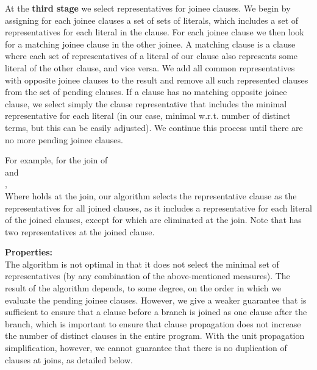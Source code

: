 At the \textbf{third stage} we select representatives for joinee clauses. 
We begin by assigning for each joinee clauses a set of sets of literals, which includes a set of representatives for each literal in the clause. For each joinee clause we then look for a matching joinee clause in the other joinee. 
A matching clause is a clause where each set of representatives of a literal of our clause also represents some literal of the other clause, and vice versa. We add all common representatives with opposite joinee clauses to the result and remove all such represented clauses from the set of pending clauses. If a clause has no matching opposite joinee clause, we select simply the clause representative that includes the minimal representative for each literal (in our case, minimal w.r.t. number of distinct terms, but this can be easily adjusted). We continue this process until there are no more pending joinee clauses.

For example, for the join of \\
 and \\
,\\
Where  holds at the join,
our algorithm selects the representative clause  as the representatives for all joined clauses, 
as it includes a representative for each literal of the joined clauses, except for  which are eliminated at the join.
Note that  has two representatives at the joined clause.

\bigskip
\textbf{Properties:}\\
The algorithm is not optimal in that it does not select the minimal set of representatives (by any combination of the above-mentioned measures).
The result of the algorithm depends, to some degree, on the order in which we evaluate the pending joinee clauses. 
However, we give a weaker guarantee that is sufficient to ensure that a clause before a branch is joined as one clause after the branch,
which is important to ensure that clause propagation does not increase the number of distinct clauses in the entire program.
With the unit propagation simplification, however, we cannot guarantee that there is no duplication of clauses at joins, as detailed below.

